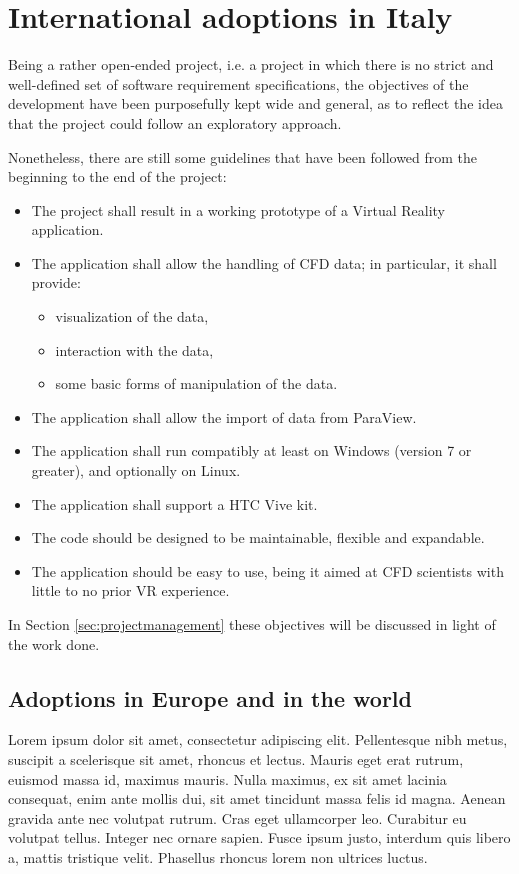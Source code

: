 \section{International adoptions in Italy}\label{sec:adoptionsinitaly}
Being a rather open-ended project, i.e. a project in which there is no strict and well-defined set of software requirement specifications, the objectives of the development have been purposefully kept wide and general, as to reflect the idea that the project could follow an exploratory approach.

Nonetheless, there are still some guidelines that have been followed from the beginning to the end of the project:

\begin{itemize}
	\item The project shall result in a working prototype of a Virtual Reality application.
	\item The application shall allow the handling of CFD data; in particular, it shall provide:
	\begin{itemize}
		\item visualization of the data,
		\item interaction with the data,
		\item some basic forms of manipulation of the data.
	\end{itemize}
	\item The application shall allow the import of data from ParaView.
	\item The application shall run compatibly at least on Windows (version 7 or greater), and optionally on Linux.
	\item The application shall support a HTC Vive kit.
	\item The code should be designed to be maintainable, flexible and expandable.
	\item The application should be easy to use, being it aimed at CFD scientists with little to no prior VR experience.
\end{itemize}

In Section \ref{sec:projectmanagement} these objectives will be discussed in light of the work done.

\subsection{Adoptions in Europe and in the world}\label{sec:adoptionsineurope}
Lorem ipsum dolor sit amet, consectetur adipiscing elit. Pellentesque nibh metus, suscipit a scelerisque sit amet, rhoncus et lectus. Mauris eget erat rutrum, euismod massa id, maximus mauris. Nulla maximus, ex sit amet lacinia consequat, enim ante mollis dui, sit amet tincidunt massa felis id magna. Aenean gravida ante nec volutpat rutrum. Cras eget ullamcorper leo. Curabitur eu volutpat tellus. Integer nec ornare sapien. Fusce ipsum justo, interdum quis libero a, mattis tristique velit. Phasellus rhoncus lorem non ultrices luctus.

